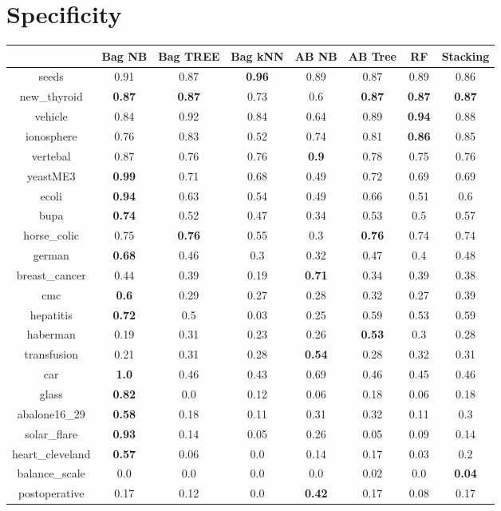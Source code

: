 \documentclass{article}%
\begin{document}
%
\section*{Specificity}%
\begin{tabular}{c|ccccccc}%
&Bag NB&Bag TREE&Bag kNN&AB NB&AB Tree&RF&Stacking\\%
\hline%
seeds&0.91&0.87&\textbf{0.96}&0.89&0.87&0.89&0.86\\%
new\_thyroid&\textbf{0.87}&\textbf{0.87}&0.73&0.6&\textbf{0.87}&\textbf{0.87}&\textbf{0.87}\\%
vehicle&0.84&0.92&0.84&0.64&0.89&\textbf{0.94}&0.88\\%
ionosphere&0.76&0.83&0.52&0.74&0.81&\textbf{0.86}&0.85\\%
vertebal&0.87&0.76&0.76&\textbf{0.9}&0.78&0.75&0.76\\%
yeastME3&\textbf{0.99}&0.71&0.68&0.49&0.72&0.69&0.69\\%
ecoli&\textbf{0.94}&0.63&0.54&0.49&0.66&0.51&0.6\\%
bupa&\textbf{0.74}&0.52&0.47&0.34&0.53&0.5&0.57\\%
horse\_colic&0.75&\textbf{0.76}&0.55&0.3&\textbf{0.76}&0.74&0.74\\%
german&\textbf{0.68}&0.46&0.3&0.32&0.47&0.4&0.48\\%
breast\_cancer&0.44&0.39&0.19&\textbf{0.71}&0.34&0.39&0.38\\%
cmc&\textbf{0.6}&0.29&0.27&0.28&0.32&0.27&0.39\\%
hepatitis&\textbf{0.72}&0.5&0.03&0.25&0.59&0.53&0.59\\%
haberman&0.19&0.31&0.23&0.26&\textbf{0.53}&0.3&0.28\\%
transfusion&0.21&0.31&0.28&\textbf{0.54}&0.28&0.32&0.31\\%
car&\textbf{1.0}&0.46&0.43&0.69&0.46&0.45&0.46\\%
glass&\textbf{0.82}&0.0&0.12&0.06&0.18&0.06&0.18\\%
abalone16\_29&\textbf{0.58}&0.18&0.11&0.31&0.32&0.11&0.3\\%
solar\_flare&\textbf{0.93}&0.14&0.05&0.26&0.05&0.09&0.14\\%
heart\_cleveland&\textbf{0.57}&0.06&0.0&0.14&0.17&0.03&0.2\\%
balance\_scale&0.0&0.0&0.0&0.0&0.02&0.0&\textbf{0.04}\\%
postoperative&0.17&0.12&0.0&\textbf{0.42}&0.17&0.08&0.17\\%
\end{tabular}
\end{document}
